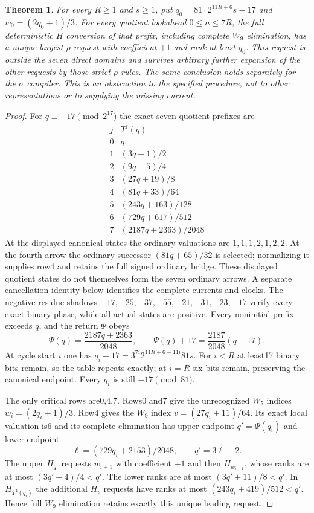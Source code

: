 \documentclass[11pt]{article}
\newtheorem{theorem}{Theorem}
\begin{document}
\begin{theorem}\label{thm:ruleavoidance}
For every $R\ge1$ and $s\ge1$, put
$q_0=81\cdot2^{11R+6}s-17$ and $w_0=(2q_0+1)/3$.
For every quotient lookahead $0\le n\le7R$, the full deterministic
$H$ conversion of that prefix, including complete $W_9$ elimination,
has a unique largest-$\rho$ request with coefficient $+1$ and rank
at least $q_0$. This request is outside the seven direct domains and
survives arbitrary further expansion of the other requests by those
strict-$\rho$ rules. The same conclusion holds separately for the
$\sigma$ compiler. This is an obstruction to the specified procedure,
not to other representations or to supplying the missing current.
\end{theorem}
\begin{proof}
For $q\equiv-17\pmod{2^{17}}$ the exact seven quotient prefixes are
\[
 \begin{array}{c|c}
 j&T^j(q)\\\hline
 0&q\\
 1&(3q+1)/2\\
 2&(9q+5)/4\\
 3&(27q+19)/8\\
 4&(81q+33)/64\\
 5&(243q+163)/128\\
 6&(729q+617)/512\\
 7&(2187q+2363)/2048
 \end{array}
\]
At the displayed canonical states the ordinary valuations are
$1,1,1,2,1,2,2$. At the fourth arrow the
ordinary successor $(81q+65)/32$ is selected; normalizing it supplies
row4 and retains the full signed ordinary bridge. These displayed quotient
states do not themselves form the seven ordinary arrows. A separate
cancellation identity below identifies the complete currents and clocks.
The negative
residue shadows $-17,-25,-37,-55,-21,-31,-23,-17$ verify every exact
binary phase, while all actual states are positive. Every noninitial
prefix exceeds $q$, and the return $\Psi$ obeys
\[
 \Psi(q)=\frac{2187q+2363}{2048},\qquad
 \Psi(q)+17=\frac{2187}{2048}(q+17).
\]
At cycle start $i$ one has
$q_i+17=3^{7i}2^{11R+6-11i}81s$. For $i<R$ at least17 binary bits
remain, so the table repeats exactly; at $i=R$ six bits remain, preserving
the canonical endpoint. Every $q_i$ is still $-17\pmod{81}$.

The only critical rows are0,4,7. Rows0 and7 give the unrecognized
$W_5$ indices $w_i=(2q_i+1)/3$. Row4 gives the $W_9$ index
$v=(27q_i+11)/64$. Its exact local valuation is6 and its complete
elimination has upper endpoint $q'=\Psi(q_i)$ and lower endpoint
\[
 \ell=(729q_i+2153)/2048,\qquad q'=3\ell-2.
\]
The upper $H_{q'}$ requests $w_{i+1}$ with coefficient $+1$ and then
$H_{w_{i+1}}$, whose ranks are at most $(3q'+4)/4<q'$. The lower
ranks are at most $(3q'+11)/8<q'$. In $H_{T^4(q_i)}$ the additional
$H_v$ requests have ranks at most $(243q_i+419)/512<q'$. Hence full
$W_9$ elimination retains exactly this unique leading request.


\end{proof}
\end{document}

